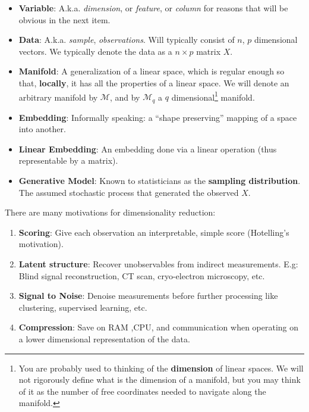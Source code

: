 \documentclass[]{book}
\providecommand{\tightlist}{%
  \setlength{\itemsep}{0pt}\setlength{\parskip}{0pt}}
\theoremstyle{definition}
\theoremstyle{definition}
\theoremstyle{remark}
\begin{document}
\begin{itemize}
\tightlist
\item
  \textbf{Variable}: A.k.a. \emph{dimension}, or \emph{feature}, or
  \emph{column} for reasons that will be obvious in the next item.
\item
  \textbf{Data}: A.k.a. \emph{sample}, \emph{observations}. Will
  typically consist of \(n\), \(p\) dimensional vectors. We typically
  denote the data as a \(n\times p\) matrix \(X\).
\item
  \textbf{Manifold}: A generalization of a linear space, which is
  regular enough so that, \textbf{locally}, it has all the properties of
  a linear space. We will denote an arbitrary manifold by
  \(\mathcal{M}\), and by \(\mathcal{M}_q\) a \(q\)
  dimensional\footnote{You are probably used to thinking of the
    \textbf{dimension} of linear spaces. We will not rigorously define
    what is the dimension of a manifold, but you may think of it as the
    number of free coordinates needed to navigate along the manifold.}
  manifold.
\item
  \textbf{Embedding}: Informally speaking: a ``shape preserving''
  mapping of a space into another.
\item
  \textbf{Linear Embedding}: An embedding done via a linear operation
  (thus representable by a matrix).
\item
  \textbf{Generative Model}: Known to statisticians as the
  \textbf{sampling distribution}. The assumed stochastic process that
  generated the observed \(X\).
\end{itemize}

There are many motivations for dimensionality reduction:

\begin{enumerate}
\def\labelenumi{\arabic{enumi}.}
\tightlist
\item
  \textbf{Scoring}: Give each observation an interpretable, simple score
  (Hotelling's motivation).
\item
  \textbf{Latent structure}: Recover unobservables from indirect
  measurements. E.g: Blind signal reconstruction, CT scan, cryo-electron
  microscopy, etc.
\item
  \textbf{Signal to Noise}: Denoise measurements before further
  processing like clustering, supervised learning, etc.
\item
  \textbf{Compression}: Save on RAM ,CPU, and communication when
  operating on a lower dimensional representation of the data.
\end{enumerate}
\end{document}
